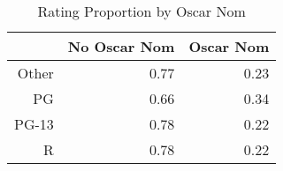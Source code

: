 \begin{table}[H]
\centering
\begin{tabular}{rrr}
  \hline
 & No Oscar Nom & Oscar Nom \\ 
  \hline
Other & 0.77 & 0.23 \\ 
  PG & 0.66 & 0.34 \\ 
  PG-13 & 0.78 & 0.22 \\ 
  R & 0.78 & 0.22 \\ 
   \hline
\end{tabular}
\caption{Rating Proportion by Oscar Nom} 
\label{tab:ron}
\end{table}

